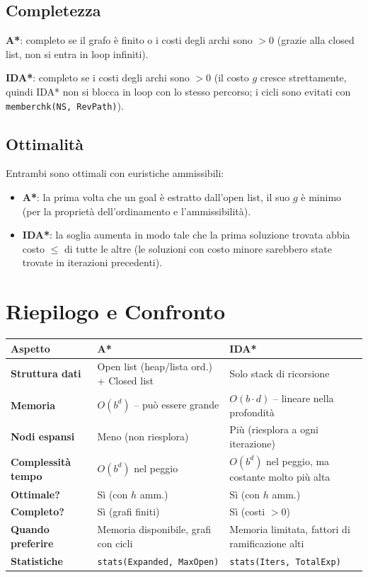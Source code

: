 \documentclass[12pt,a4paper]{article}
\begin{document}
\subsection{Completezza}

\textbf{A*}: completo se il grafo è finito o i costi degli archi sono $> 0$
(grazie alla closed list, non si entra in loop infiniti).

\textbf{IDA*}: completo se i costi degli archi sono $> 0$ (il costo $g$ cresce
strettamente, quindi IDA* non si blocca in loop con lo stesso percorso; i cicli
sono evitati con \texttt{memberchk(NS, RevPath)}).

\subsection{Ottimalità}

Entrambi sono ottimali con euristiche ammissibili:
\begin{itemize}[noitemsep]
  \item \textbf{A*}: la prima volta che un goal è estratto dall'open list, il
        suo $g$ è minimo (per la proprietà dell'ordinamento e l'ammissibilità).
  \item \textbf{IDA*}: la soglia aumenta in modo tale che la prima soluzione
        trovata abbia costo $\le$ di tutte le altre (le soluzioni con costo
        minore sarebbero state trovate in iterazioni precedenti).
\end{itemize}

\section{Riepilogo e Confronto}

\begin{center}
\renewcommand{\arraystretch}{1.4}
\begin{tabular}{p{4cm}p{5cm}p{5cm}}
\toprule
\textbf{Aspetto} & \textbf{A*} & \textbf{IDA*} \\
\midrule
\textbf{Struttura dati} & Open list (heap/lista ord.) + Closed list & Solo stack di ricorsione \\
\textbf{Memoria} & $O(b^d)$ -- può essere grande & $O(b \cdot d)$ -- lineare nella profondità \\
\textbf{Nodi espansi} & Meno (non riesplora) & Più (riesplora a ogni iterazione) \\
\textbf{Complessità tempo} & $O(b^d)$ nel peggio & $O(b^d)$ nel peggio, ma costante molto più alta \\
\textbf{Ottimale?} & Sì (con $h$ amm.) & Sì (con $h$ amm.) \\
\textbf{Completo?} & Sì (grafi finiti) & Sì (costi $> 0$) \\
\textbf{Quando preferire} & Memoria disponibile, grafi con cicli & Memoria limitata, fattori di ramificazione alti \\
\textbf{Statistiche} & \texttt{stats(Expanded, MaxOpen)} & \texttt{stats(Iters, TotalExp)} \\
\bottomrule
\end{tabular}
\end{center}
\end{document}

